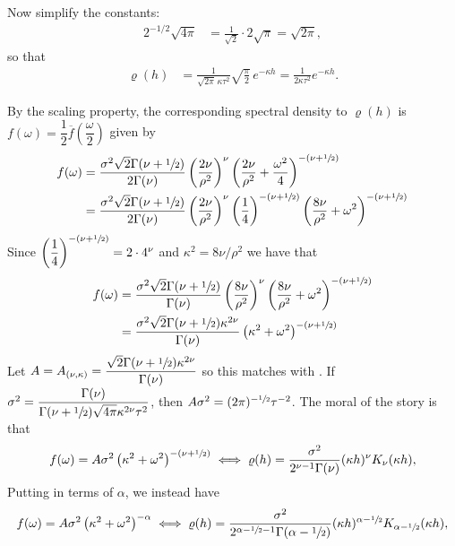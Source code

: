 \documentclass[11pt,a4paper]{article}
\theoremstyle{plain}
\theoremstyle{definition}
\begin{document}
Now simplify the constants:
\begin{align}
2^{-1/2}\sqrt{4\pi}
&=
\frac{1}{\sqrt{2}} \cdot 2\sqrt{\pi}
=
\sqrt{2\pi},
\end{align}
so that
\begin{align}
\varrho(h)
&=
\frac{1}{\sqrt{2\pi}\,\kappa\tau^2}
\sqrt{\frac{\pi}{2}}\, e^{-\kappa h}
=
\frac{1}{2\kappa \tau^2} e^{-\kappa h}.
\end{align}

By the scaling property, the corresponding spectral density to $\varrho(h)$ is $f(\omega) = \dfrac{1}{2}\overline{f}\left(\dfrac{\omega}{2}\right)$ given by
\begin{align}
    f(\omega) & = \dfrac{\sigma^2\sqrt{2}\Gamma(\nu+\sfrac{1}{2})}{2\Gamma(\nu)}\left(\dfrac{2\nu}{\rho^2}\right)^\nu \left(\dfrac{2\nu}{\rho^2}+\dfrac{\omega^2}{4}\right)^{-(\nu+\sfrac{1}{2})}\\
   & = \dfrac{\sigma^2\sqrt{2}\Gamma(\nu+\sfrac{1}{2})}{2\Gamma(\nu)}\left(\dfrac{2\nu}{\rho^2}\right)^\nu \left(\dfrac{1}{4}\right)^{-(\nu+\sfrac{1}{2})}\left(\dfrac{8\nu}{\rho^2}+\omega^2\right)^{-(\nu+\sfrac{1}{2})}
\end{align}
Since $\left(\dfrac{1}{4}\right)^{-(\nu+\sfrac{1}{2})} = 2\cdot 4^\nu$ and $\kappa^2 = 8\nu/\rho^2$ we have that
\begin{align}
    f(\omega) &= \dfrac{\sigma^2\sqrt{2}\Gamma(\nu+\sfrac{1}{2})}{\Gamma(\nu)}\left(\dfrac{8\nu}{\rho^2}\right)^\nu \left(\dfrac{8\nu}{\rho^2}+\omega^2\right)^{-(\nu+\sfrac{1}{2})}\\
    &= \dfrac{\sigma^2\sqrt{2}\Gamma(\nu+\sfrac{1}{2})\kappa^{2\nu}}{\Gamma(\nu)}\left(\kappa^2+\omega^2\right)^{-(\nu+\sfrac{1}{2})}
\end{align}
Let $A = A_{(\nu,\kappa)} = \dfrac{\sqrt{2}\Gamma(\nu+\sfrac{1}{2})\kappa^{2\nu}}{\Gamma(\nu)}$ so this matches with \cite{Bolin2025Linear}. If $\sigma^2 =  \dfrac{\Gamma(\nu)}{\Gamma(\nu+\sfrac{1}{2})\sqrt{4\pi}\kappa^{2\nu}\tau^2}$, then $A\sigma^2 = (2\pi)^{-\sfrac{1}{2}}\tau^{-2}$. The moral of the story is that 
\begin{align}
    f(\omega) = A\sigma^2\left(\kappa^2+\omega^2\right)^{-(\nu+\sfrac{1}{2})}\iff \varrho(h) = \dfrac{\sigma^2}{2^{\nu-1}\Gamma(\nu)}(\kappa h)^\nu K_\nu(\kappa h), 
\end{align}
Putting in terms of $\alpha$, we instead have
\begin{align}
    f(\omega) = A\sigma^2\left(\kappa^2+\omega^2\right)^{-\alpha}\iff \varrho(h) = \dfrac{\sigma^2}{2^{\alpha-\sfrac{1}{2}-1}\Gamma(\alpha-\sfrac{1}{2})}(\kappa h)^{\alpha-\sfrac{1}{2}} K_{\alpha-\sfrac{1}{2}}(\kappa h), 
\end{align}
\end{document}

